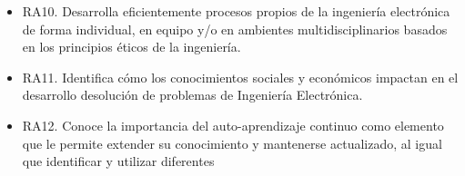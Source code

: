 \documentclass{article}
\begin{document}
\begin{itemize}
  \item RA10. Desarrolla   eficientemente procesos propios de la ingeniería electrónica de forma   individual, en equipo y/o en ambientes multidisciplinarios basados en los   principios éticos de la ingeniería.                                                    
 \item  RA11.   Identifica cómo los conocimientos sociales y económicos impactan en el   desarrollo desolución de problemas de Ingeniería Electrónica.                                                                                                                
  \item RA12.   Conoce la importancia del auto-aprendizaje continuo como elemento que le   permite extender su conocimiento y mantenerse actualizado, al igual que   identificar y utilizar diferentes                                                             
\end{itemize}
\end{document}
